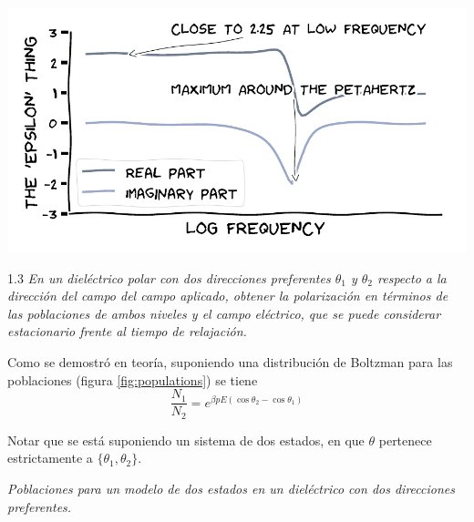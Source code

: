 \documentclass{tufte-book}
\begin{document}
\begin{center}
  \includegraphics{figures/xkcd12.pdf}
\end{center}




\begin{tcolorbox}[halign=left]
  \lettrine[lines=2]{\color{ExerciseNumberColor}1.3}{}
  \emph{
    En un dieléctrico polar con dos direcciones preferentes $θ_1$ y
    $θ_2$ respecto a la dirección del campo del campo aplicado,
    obtener la polarización en términos de las poblaciones de ambos
    niveles y el campo eléctrico, que se puede considerar estacionario
    frente al tiempo de relajación.
  }
\end{tcolorbox}

Como se demostró en teoría, suponiendo una distribución de Boltzman
para las poblaciones (figura \ref{fig:populations}) se tiene
\begin{equation}
  \frac{N_1}{N_2} = e^{βpE(\cos θ_2 - \cos θ_1)}
\end{equation}

Notar que se está suponiendo un sistema de dos estados, en que $θ$
pertenece estrictamente a $\{θ_1,θ_2\}$.

\begin{marginfigure}
  \centering
  \caption{\itshape Poblaciones para un modelo de dos estados en un dieléctrico
    con dos direcciones preferentes.}
  \label{fig:populations}
\end{marginfigure}
\end{document}
